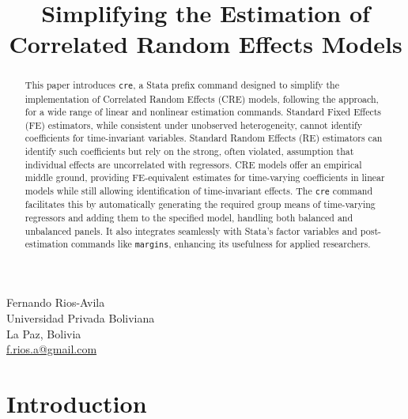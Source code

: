 \documentclass[bib]{statapress}
\begin{document}


 
\title[]{Simplifying the Estimation of Correlated Random Effects Models}


\makeatletter

\author{}{
Fernando Rios-Avila
\\
Universidad Privada Boliviana\\
La Paz, Bolivia\\

\href{mailto:f.rios.a@gmail.com}{f.rios.a@gmail.com}
}
 
 
 

\maketitle

\begin{abstract}

This paper introduces \texttt{cre}, a Stata prefix command designed to
simplify the implementation of Correlated Random Effects (CRE) models,
following the \citet{mundlak1978pooling} approach, for a wide range of
linear and nonlinear estimation commands. Standard Fixed Effects (FE)
estimators, while consistent under unobserved heterogeneity, cannot
identify coefficients for time-invariant variables. Standard Random
Effects (RE) estimators can identify such coefficients but rely on the
strong, often violated, assumption that individual effects are
uncorrelated with regressors. CRE models offer an empirical middle
ground, providing FE-equivalent estimates for time-varying coefficients
in linear models while still allowing identification of time-invariant
effects. The \texttt{cre} command facilitates this by automatically
generating the required group means of time-varying regressors and
adding them to the specified model, handling both balanced and
unbalanced panels. It also integrates seamlessly with Stata's factor
variables and post-estimation commands like \texttt{margins}, enhancing
its usefulness for applied researchers.

\end{abstract}

\section{Introduction}\label{introduction}
\end{document}
